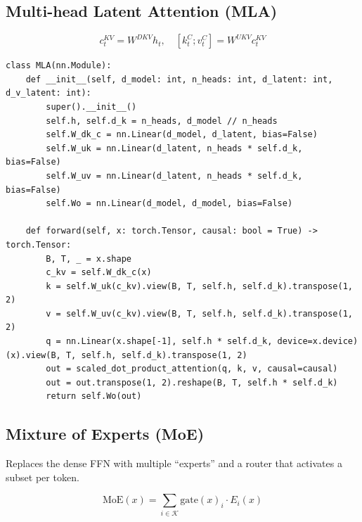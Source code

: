 \subsection{Multi-head Latent Attention (MLA)}
\label{form:mla}

\[
  c_t^{KV} = W^{DKV} h_t, \quad [k_t^C; v_t^C] = W^{UKV} c_t^{KV}
\]

\begin{lstlisting}[style=pythonstyle, caption={Multi-head latent attention (MLA)}, label=lst:mla]
class MLA(nn.Module):
    def __init__(self, d_model: int, n_heads: int, d_latent: int, d_v_latent: int):
        super().__init__()
        self.h, self.d_k = n_heads, d_model // n_heads
        self.W_dk_c = nn.Linear(d_model, d_latent, bias=False)
        self.W_uk = nn.Linear(d_latent, n_heads * self.d_k, bias=False)
        self.W_uv = nn.Linear(d_latent, n_heads * self.d_k, bias=False)
        self.Wo = nn.Linear(d_model, d_model, bias=False)

    def forward(self, x: torch.Tensor, causal: bool = True) -> torch.Tensor:
        B, T, _ = x.shape
        c_kv = self.W_dk_c(x)
        k = self.W_uk(c_kv).view(B, T, self.h, self.d_k).transpose(1, 2)
        v = self.W_uv(c_kv).view(B, T, self.h, self.d_k).transpose(1, 2)
        q = nn.Linear(x.shape[-1], self.h * self.d_k, device=x.device)(x).view(B, T, self.h, self.d_k).transpose(1, 2)
        out = scaled_dot_product_attention(q, k, v, causal=causal)
        out = out.transpose(1, 2).reshape(B, T, self.h * self.d_k)
        return self.Wo(out)
\end{lstlisting}

\subsection{Mixture of Experts (MoE)}
\label{form:moe}

Replaces the dense FFN with multiple ``experts'' and a router that activates a subset per token.

\[
  \mathrm{MoE}(x) = \sum_{i \in \mathcal{K}} \mathrm{gate}(x)_i \cdot E_i(x)
\]

